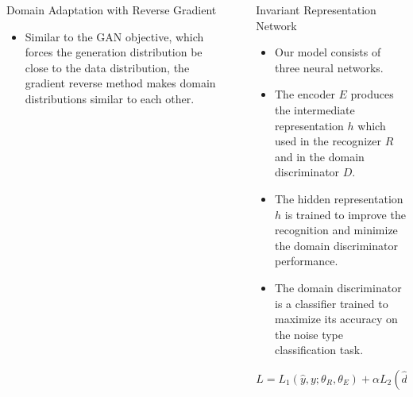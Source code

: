 \documentclass[final]{beamer}
\newlength{\sepwid}
\newlength{\onecolwid}
\newlength{\twocolwid}
\begin{document}
\begin{frame}[t]
\begin{columns}[t]
\begin{column}{\onecolwid}
\begin{block}{Domain Adaptation with Reverse Gradient}
\begin{itemize}
        \item Similar to the GAN objective, which forces the generation distribution be close to the data distribution,
        the \textcolor{dblue}{gradient reverse method} makes domain distributions similar to each other.
    \end{itemize}
    
\end{block}

\end{column} %

\begin{column}{\sepwid}\end{column} %

\begin{column}{\twocolwid}

    \begin{columns}[t]

        \begin{column}{\onecolwid} %
            \begin{block}{{\Large Invariant Representation Network}}
                \begin{itemize}
                    \item Our model consists of three neural networks. 
                    \item The \textcolor{dblue}{encoder} $E$ produces
                        the intermediate representation $h$ which used in the \textcolor{dblue}{recognizer} $R$ and 
                        in the \textcolor{dblue}{domain discriminator} $D$. 
                    \item The hidden representation $h$ is trained to improve
                        the recognition and minimize the domain discriminator performance. 
                    \item The domain discriminator
                        is a classifier trained to maximize its accuracy on the noise type
                        classification task.
                \end{itemize}
                \begin{equation*}
                    L = L_1(\hat{y}, y; \theta_R, \theta_E) + 
                    \alpha L_2(\hat{d}, d; \theta_D) -
                    \beta L_3(\hat{d}, d; \theta_E)
                \end{equation*}


\end{block}
\end{column}
\end{columns}
\end{column}
\end{columns}
\end{frame}
\end{document}

